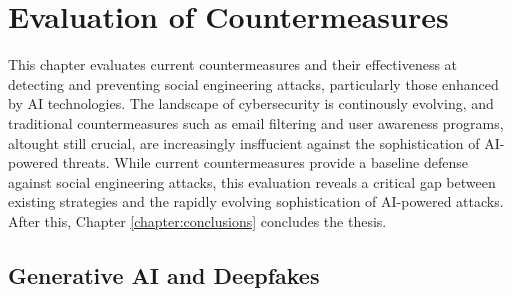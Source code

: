 



\chapter{Evaluation of Countermeasures\label{chapter:evaluation}}
\begin{comment}

Guides:
    - Rest of the thesis (thesis max of 20 - other chapters and pages)
    - Fill the thesis with content in this chapter

TODO:
    [ ] 

What to cover:
    - OpenAI attempts to control how ChatGPT etc are used
    - Efficacy of EU and other level regulations
    - Instagram flagging content that might've been generated with AI (this is futile in the future?)
    
Literature:
    - 

\end{comment}

This chapter evaluates current countermeasures and their effectiveness at detecting and preventing social engineering attacks, particularly those enhanced by AI technologies. The landscape of cybersecurity is continously evolving, and traditional countermeasures such as email filtering and user awareness programs, altought still crucial, are increasingly insffucient against the sophistication of AI-powered threats. While current countermeasures provide a baseline defense against social engineering attacks, this evaluation reveals a critical gap between existing strategies and the rapidly evolving sophistication of AI-powered attacks. After this, Chapter \ref{chapter:conclusions} concludes the thesis.













\section{Generative AI and Deepfakes}

\begin{comment}    
    - Deepfake content detection
    - Spear phishing detection
\end{comment}

